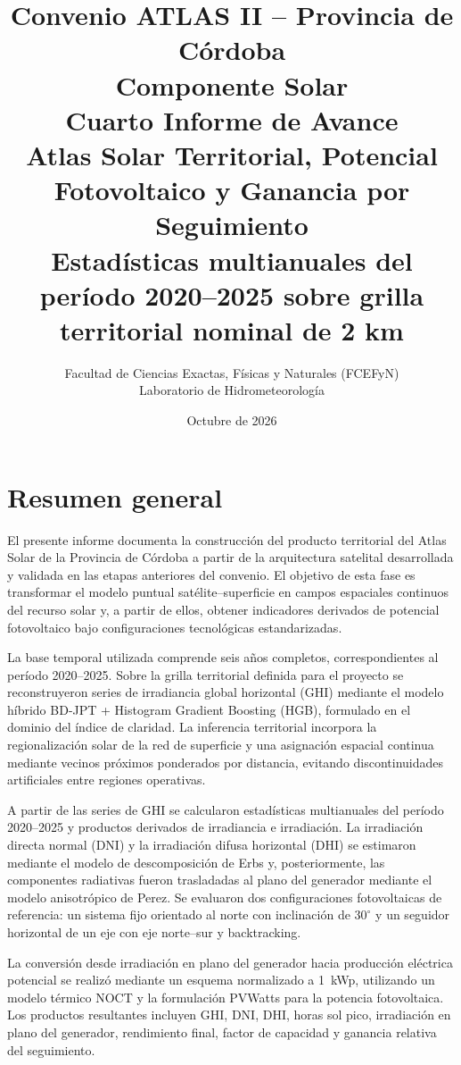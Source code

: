 \documentclass[11pt,a4paper]{article}
\title{\textbf{Convenio ATLAS II -- Provincia de Córdoba}\\
Componente Solar\\[1.2em]
\Large \textbf{Cuarto Informe de Avance}\\[0.4em]
\large Atlas Solar Territorial, Potencial Fotovoltaico y Ganancia por Seguimiento\\
\normalsize Estadísticas multianuales del período 2020--2025 sobre grilla territorial nominal de 2 km}
\author{Facultad de Ciencias Exactas, Físicas y Naturales (FCEFyN)\\
Laboratorio de Hidrometeorología}
\date{Octubre de 2026}
\begin{document}
\maketitle
\thispagestyle{empty}
\newpage

\section*{Resumen general}

El presente informe documenta la construcción del producto territorial del Atlas Solar de la Provincia de Córdoba a partir de la arquitectura satelital desarrollada y validada en las etapas anteriores del convenio. El objetivo de esta fase es transformar el modelo puntual satélite--superficie en campos espaciales continuos del recurso solar y, a partir de ellos, obtener indicadores derivados de potencial fotovoltaico bajo configuraciones tecnológicas estandarizadas.

La base temporal utilizada comprende seis años completos, correspondientes al período 2020--2025. Sobre la grilla territorial definida para el proyecto se reconstruyeron series de irradiancia global horizontal (GHI) mediante el modelo híbrido BD-JPT + Histogram Gradient Boosting (HGB), formulado en el dominio del índice de claridad. La inferencia territorial incorpora la regionalización solar de la red de superficie y una asignación espacial continua mediante vecinos próximos ponderados por distancia, evitando discontinuidades artificiales entre regiones operativas.

A partir de las series de GHI se calcularon estadísticas multianuales del período 2020--2025 y productos derivados de irradiancia e irradiación. La irradiación directa normal (DNI) y la irradiación difusa horizontal (DHI) se estimaron mediante el modelo de descomposición de Erbs y, posteriormente, las componentes radiativas fueron trasladadas al plano del generador mediante el modelo anisotrópico de Perez. Se evaluaron dos configuraciones fotovoltaicas de referencia: un sistema fijo orientado al norte con inclinación de $30^\circ$ y un seguidor horizontal de un eje con eje norte--sur y backtracking.

La conversión desde irradiación en plano del generador hacia producción eléctrica potencial se realizó mediante un esquema normalizado a 1~kWp, utilizando un modelo térmico NOCT y la formulación PVWatts para la potencia fotovoltaica. Los productos resultantes incluyen GHI, DNI, DHI, horas sol pico, irradiación en plano del generador, rendimiento final, factor de capacidad y ganancia relativa del seguimiento.
\end{document}
